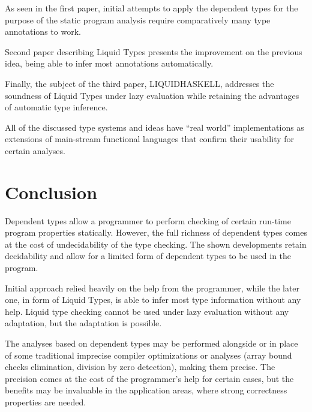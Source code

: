 \documentclass[a4paper,UKenglish]{lipics-v2016}
\begin{document}
As seen in the first paper, initial attempts to apply the dependent types for
the purpose of the static program analysis require comparatively many type
annotations to work.

Second paper describing Liquid Types presents the improvement on the previous
idea, being able to infer most annotations automatically.

Finally, the subject of the third paper, LIQUIDHASKELL, addresses the soundness
of Liquid Types under lazy evaluation while retaining the advantages of
automatic type inference.

All of the discussed type systems and ideas have ``real world'' implementations
as extensions of main-stream functional languages that confirm their usability
for certain analyses.

\section{Conclusion}

Dependent types allow a programmer to perform checking of certain run-time
program properties statically. However, the full richness of dependent types
comes at the cost of undecidability of the type checking. The shown
developments retain decidability and allow for a limited form of dependent
types to be used in the program.

Initial approach relied heavily on the help from the programmer, while the
later one, in form of Liquid Types, is able to infer most type information
without any help. Liquid type checking cannot be used under lazy evaluation
without any adaptation, but the adaptation is possible.

The analyses based on dependent types may be performed alongside or in place of
some traditional imprecise compiler optimizations or analyses (array bound
checks elimination, division by zero detection), making them precise. The
precision comes at the cost of the programmer's help for certain cases, but the
benefits may be invaluable in the application areas, where strong correctness
properties are needed.





\end{document}
